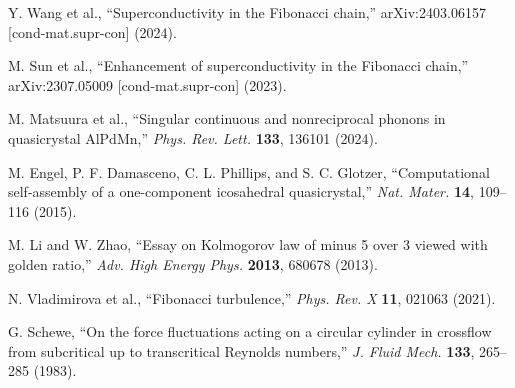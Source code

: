 \begin{thebibliography}{99}
Y. Wang et al.,
``Superconductivity in the Fibonacci chain,''
arXiv:2403.06157 [cond-mat.supr-con] (2024).

M. Sun et al.,
``Enhancement of superconductivity in the Fibonacci chain,''
arXiv:2307.05009 [cond-mat.supr-con] (2023).

M. Matsuura et al.,
``Singular continuous and nonreciprocal phonons in quasicrystal AlPdMn,''
\emph{Phys. Rev. Lett.} \textbf{133}, 136101 (2024).

M. Engel, P. F. Damasceno, C. L. Phillips, and S. C. Glotzer,
``Computational self-assembly of a one-component icosahedral quasicrystal,''
\emph{Nat. Mater.} \textbf{14}, 109--116 (2015).

M. Li and W. Zhao,
``Essay on Kolmogorov law of minus 5 over 3 viewed with golden ratio,''
\emph{Adv. High Energy Phys.} \textbf{2013}, 680678 (2013).

N. Vladimirova et al.,
``Fibonacci turbulence,''
\emph{Phys. Rev. X} \textbf{11}, 021063 (2021).

G. Schewe,
``On the force fluctuations acting on a circular cylinder in crossflow from subcritical up to transcritical Reynolds numbers,''
\emph{J. Fluid Mech.} \textbf{133}, 265--285 (1983).

\end{thebibliography}
